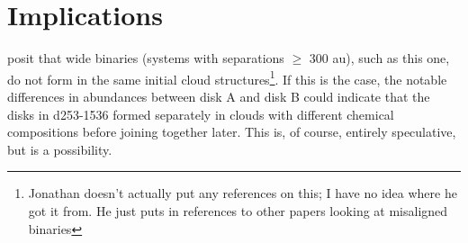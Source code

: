 \section{Implications}







\citet{Williams2014} posit that wide binaries (systems with separations $\geq$ 300 au), such as this one, do not form in the same initial cloud structures\footnote{Jonathan doesn't actually put any references on this; I have no idea where he got it from. He just puts in references to other papers looking at misaligned binaries}. If this is the case, the notable differences in abundances between disk A and disk B could indicate that the disks in d253-1536 formed separately in clouds with different chemical compositions before joining together later. This is, of course, entirely speculative, but is a possibility.


















